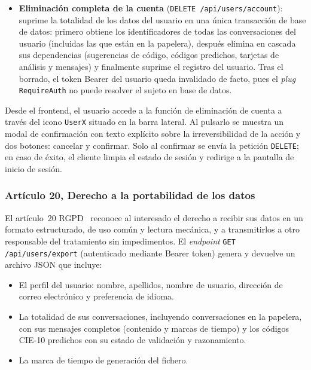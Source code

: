 \begin{itemize}
Los eventos conservan los identificadores de usuario y de conversación, de modo que tras la supresión quedan como registro seudonimizado sin contenido clínico; es una limitación declarada, no una garantía de borrado total del registro.

La frontera está fijada con pruebas automáticas (\texttt{App.RgpdEventStoreTest}) que fallan si alguien vuelve a añadir el texto a un evento. Sin ellas el error sería invisible: el sistema seguiría funcionando y el informe quedaría almacenado para siempre.

 \item \textbf{Eliminación completa de la cuenta} (\texttt{DELETE /api/users/account}): suprime la totalidad de los datos del usuario en una única transacción de base de datos: primero obtiene los identificadores de todas las conversaciones del usuario (incluidas las que están en la papelera), después elimina en cascada sus dependencias (sugerencias de código, códigos predichos, tarjetas de análisis y mensajes) y finalmente suprime el registro del usuario. Tras el borrado, el token Bearer del usuario queda invalidado de facto, pues el \emph{plug} \texttt{RequireAuth} no puede resolver el sujeto en base de datos.
\end{itemize}

Desde el frontend, el usuario accede a la función de eliminación de cuenta a través del icono \texttt{UserX} situado en la barra lateral. Al pulsarlo se muestra un modal de confirmación con texto explícito sobre la irreversibilidad de la acción y dos botones: cancelar y confirmar. Solo al confirmar se envía la petición \texttt{DELETE}; en caso de éxito, el cliente limpia el estado de sesión y redirige a la pantalla de inicio de sesión.

\subsubsection{Artículo 20, Derecho a la portabilidad de los datos}

El artículo~20 RGPD~\cite{RGPD16} reconoce al interesado el derecho a recibir sus datos en un formato estructurado, de uso común y lectura mecánica, y a transmitirlos a otro responsable del tratamiento sin impedimentos. El \emph{endpoint} \texttt{GET /api/users/export} (autenticado mediante Bearer token) genera y devuelve un archivo JSON que incluye:

\begin{itemize}
 \item El perfil del usuario: nombre, apellidos, nombre de usuario, dirección de correo electrónico y preferencia de idioma.
 \item La totalidad de sus conversaciones, incluyendo conversaciones en la papelera, con sus mensajes completos (contenido y marcas de tiempo) y los códigos CIE-10 predichos con su estado de validación y razonamiento.
 \item La marca de tiempo de generación del fichero.
\end{itemize}

